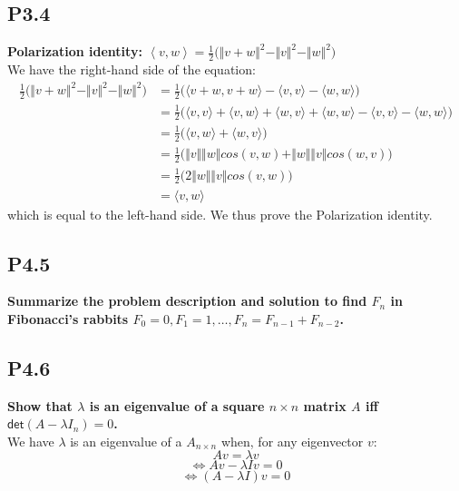 \documentclass[12pt]{article}
\begin{document}
\subsection*{P3.4}
\textbf{Polarization identity:  $\left \langle v,w \right \rangle = \frac1{2}\big(\Vert v+w\Vert^2 -\Vert v\Vert^2 - \Vert w\Vert^2 \big)$}\\
We have the right-hand side of the equation:
\begin{align*}
\frac1{2}\big(\Vert v+w\Vert^2 -\Vert v\Vert^2 - \Vert w\Vert^2 \big) &= \frac1{2}\big(\langle v+w,v+w \rangle - \langle v,v \rangle - \langle w,w \rangle \big)\\
& = \frac1{2}\big(\langle v, v \rangle + \langle v, w \rangle + \langle w, v \rangle + \langle w,w \rangle - \langle v,v \rangle - \langle w,w \rangle \big)\\
& = \frac1{2}\big(\langle v,w \rangle + \langle w,v \rangle \big)\\
& = \frac1{2}\big(\Vert v\Vert\Vert w \Vert cos(v,w) + \Vert w \Vert \Vert v\Vert cos(w,v)\big)\\
& = \frac1{2}\big(2\Vert w \Vert \Vert v \Vert cos(v,w)\big)\\
& = \langle v,w \rangle
\end{align*}
which is equal to the left-hand side. We thus prove the Polarization identity.





\subsection*{P4.5}
\textbf{Summarize the problem description and solution to find $F_n$ in Fibonacci's rabbits $F_0=0, F_1=1, \dots, F_n=F_{n-1}+F_{n-2}$.}\\







\subsection*{P4.6}
\textbf{Show that $\lambda$ is an eigenvalue of a square $n\times n$ matrix $A$ iff $\textsf{det}(A-\lambda I_n) = 0$. }\\
We have $\lambda$ is an eigenvalue of a $A_{n\times n}$ when, for any eigenvector $v$:
$$Av=\lambda v$$
$$\Leftrightarrow Av-\lambda Iv= 0$$
$$\Leftrightarrow (A-\lambda I)v=0$$
\end{document}
